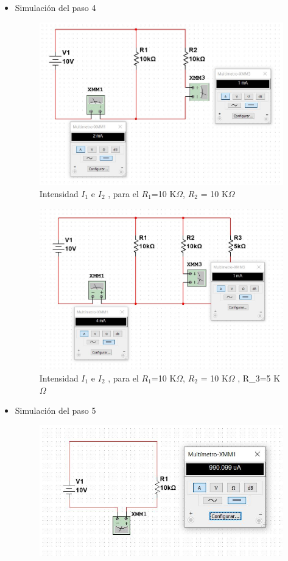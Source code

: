 \documentclass[twoside,twocolumn]{article}
\begin{document}
\begin{itemize}
\item Simulación del paso 4
    \begin{figure}[h]
    \centering
    \includegraphics[scale=0.28]{imagenes1/4.1.JPG}
    \caption{Intensidad $I_{1}$ e $I_{2}$ , para el $R_{1}$=10 K$\Omega$, $R_{2}$ = 10 K$\Omega$ }
    \label{fig:circuito4}
    \end{figure}
\newpage   
    \begin{figure}[h]
    \centering
    \includegraphics[scale=0.3]{imagenes1/4.2.JPG}
    \caption{Intensidad $I_{1}$ e $I_{2}$ , para el $R_{1}$=10 K$\Omega$, $R_{2}$ = 10 K$\Omega$ , R_{3}=5 K$\Omega$ }
    \label{fig:circuito4}
    \end{figure}
\item Simulación del paso 5    
    \begin{figure}[h]
    \centering
    \includegraphics[scale=0.42]{imagenes1/5.1.JPG}

\end{figure}
\end{itemize}
\end{document}
